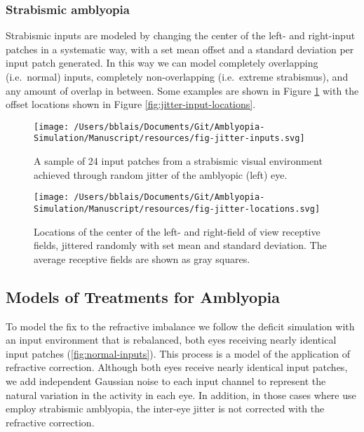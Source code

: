 \documentclass[
  onecolumn]{article}
\begin{document}
\hypertarget{strabismic-amblyopia}{%
\subsubsection{Strabismic amblyopia}\label{strabismic-amblyopia}}

Strabismic inputs are modeled by changing the center of the left- and
right-input patches in a systematic way, with a set mean offset and a
standard deviation per input patch generated. In this way we can model
completely overlapping (i.e.~normal) inputs, completely non-overlapping
(i.e.~extreme strabismus), and any amount of overlap in between. Some
examples are shown in Figure \ref{fig:jitter-inputs} with the offset
locations shown in Figure \ref{fig:jitter-input-locations}.

\begin{figure}
\hypertarget{fig:jitter-inputs}{%
\centering
\texttt{[image: /Users/bblais/Documents/Git/Amblyopia-Simulation/Manuscript/resources/fig-jitter-inputs.svg]}
\caption{A sample of 24 input patches from a strabismic visual
environment achieved through random jitter of the amblyopic (left)
eye.}\label{fig:jitter-inputs}
}
\end{figure}

\begin{figure}
\hypertarget{fig:jitter-locations}{%
\centering
\texttt{[image: /Users/bblais/Documents/Git/Amblyopia-Simulation/Manuscript/resources/fig-jitter-locations.svg]}
\caption{Locations of the center of the left- and right-field of view
receptive fields, jittered randomly with set mean and standard
deviation. The average receptive fields are shown as gray
squares.}\label{fig:jitter-locations}
}
\end{figure}

\hypertarget{models-of-treatments-for-amblyopia}{%
\subsection{Models of Treatments for
Amblyopia}\label{models-of-treatments-for-amblyopia}}

To model the fix to the refractive imbalance we follow the deficit
simulation with an input environment that is rebalanced, both eyes
receiving nearly identical input patches (\ref{fig:normal-inputs}). This
process is a model of the application of refractive correction. Although
both eyes receive nearly identical input patches, we add independent
Gaussian noise to each input channel to represent the natural variation
in the activity in each eye. In addition, in those cases where use
employ strabismic amblyopia, the inter-eye jitter is not corrected with
the refractive correction.
\end{document}
